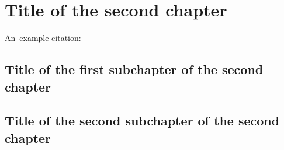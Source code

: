 \chapter{Title of the second chapter}

An~example citation: \cite{Andel07}

\section{Title of the first subchapter of the second chapter}

\section{Title of the second subchapter of the second chapter}
